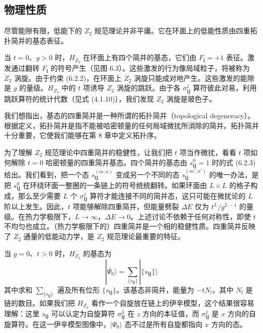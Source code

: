 \subsection{物理性质}

\begin{keypoints}
\item 尽管能隙有限，低能下的 $Z_2$ 规范理论并非平庸。它在环面上的低能性质由四重拓扑简并的基态表征。
\end{keypoints}

当 $t = 0$、$g > 0$ 时，$H_{Z_2}$ 在环面上有四个简并的基态，它们由 $F_{\pmb{i}} = +1$ 表征。激发通过翻转 $F_{\pmb{i}}$ 的符号产生（见图 6.3）。这些激发的行为像局域粒子，将被称为 $Z_2$ 涡旋。由于约束 (6.2.2)，在环面上 $Z_2$ 涡旋只能成对地产生。这些激发的能隙是 $g$ 的量级。$H_{Z_2}$ 中的 $t$ 项诱导 $Z_2$ 涡旋的跳跃。由于各 $\sigma^1_{\pmb{ij}}$ 算符彼此对易，利用跳跃算符的统计代数（见式 (4.1.10)），我们发现 $Z_2$ 涡旋是玻色子。

我们想指出，基态的四重简并是一种所谓的拓扑简并（topological degeneracy）。根据定义，拓扑简并是指不能被哈密顿量的任何局域微扰所消除的简并。拓扑简并十分重要，它使我们能够在第 8 章中定义拓扑序。

为了理解 $Z_2$ 规范理论中四重简并的稳健性，让我们把 $t$ 项当作微扰，看看 $t$ 项如何解除 $t = 0$ 哈密顿量的四重简并基态。四个简并的基态由 $s^0_{\pmb{ij}} = 1$ 时的式 (6.2.3) 给出。我们看到，把一个态 $s^{(m,n)}_{\pmb{ij}}$ 变成另一个不同的态 $s^{(m',n')}_{\pmb{ij}}$ 的唯一办法，是把 $s^0_{\pmb{ij}}$ 在环绕环面一整圈的一条链上的符号统统翻转。如果环面由 $L \times L$ 的格子构成，那么至少需要 $L$ 个 $\sigma^1_{\pmb{ij}}$ 算符才能连接不同的简并态，这只可能在微扰论的 $L$ 阶以上发生。因此，$t$ 项能够解除四重简并，但能量劈裂 $\Delta E$ 仅为 $t^L/g^{L-1}$ 的量级。在热力学极限下，$L \to \infty$，$\Delta E \to 0$。上述讨论不依赖于任何对称性，即使 $t$ 不均匀也成立。（热力学极限下的）四重简并是一个相的稳健性质。四重简并反映了 $Z_2$ 通量的低能动力学，是 $Z_2$ 规范理论最重要的特征。


当 $g = 0$、$t > 0$ 时，$H_{Z_2}$ 的基态为
\begin{equation*}
|\Psi_0\rangle = \sum_{\{s_{\pmb{ij}}\}} |\{s_{\pmb{ij}}\}\rangle\tag{6.2.5}
\end{equation*}
其中求和 $\sum_{\{s_{\pmb{ij}}\}}$ 遍及所有位形 $\{s_{\pmb{ij}}\}$。该基态非简并，能量为 $-tN_l$，其中 $N_l$ 是链的数目。如果我们把 $H_{Z_2}$ 看作一个自旋放在链上的伊辛模型，这个结果很容易理解：这里 $s_{\pmb{ij}}$ 可以认定为自旋算符 $\sigma^3_{\pmb{ij}}$ 在 $z$ 方向的本征值，而 $\sigma^1_{\pmb{ij}}$ 是 $x$ 方向的自旋算符。在这一伊辛模型图像中，$|\Psi_0\rangle$ 态不过是所有自旋都指向 $x$ 方向的态。

